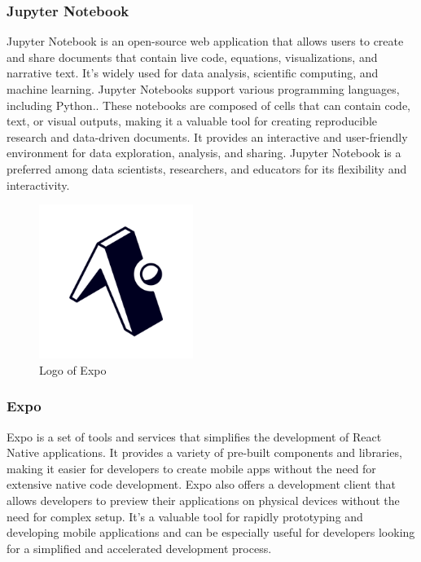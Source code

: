 \documentclass[conference]{IEEEtran}
\begin{document}
        \subsubsection{Jupyter Notebook}
        Jupyter Notebook is an open-source web application that allows users to create and share documents that contain live code, equations, visualizations, and narrative text. It's widely used for data analysis, scientific computing, and machine learning. Jupyter Notebooks support various programming languages, including Python.. These notebooks are composed of cells that can contain code, text, or visual outputs, making it a valuable tool for creating reproducible research and data-driven documents. It provides an interactive and user-friendly environment for data exploration, analysis, and sharing. Jupyter Notebook is a preferred among data scientists, researchers, and educators for its flexibility and interactivity.\\

        \begin{figure}[htbp]
        \centerline{\includegraphics[width=5cm]{Images/logo/expo.png}}
        \label{fig}
        \caption{Logo of Expo}
        \end{figure}
        \subsubsection{Expo}
        Expo is a set of tools and services that simplifies the development of React Native applications. It provides a variety of pre-built components and libraries, making it easier for developers to create mobile apps without the need for extensive native code development. Expo also offers a development client that allows developers to preview their applications on physical devices without the need for complex setup. It's a valuable tool for rapidly prototyping and developing mobile applications and can be especially useful for developers looking for a simplified and accelerated development process.\\
\end{document}
